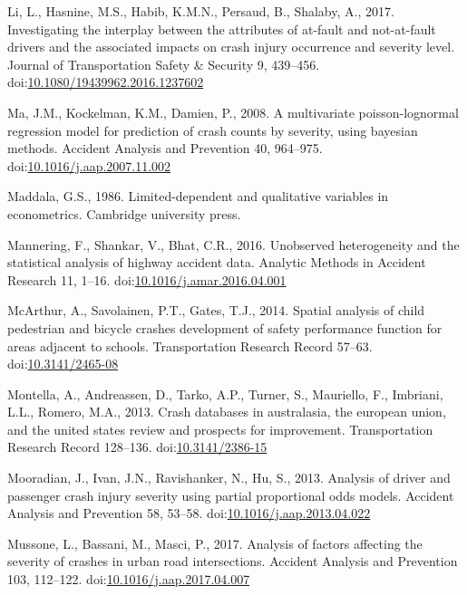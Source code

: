 \documentclass[]{elsarticle} %
\begin{document}
\leavevmode\hypertarget{ref-Li2017interplay}{}%
Li, L., Hasnine, M.S., Habib, K.M.N., Persaud, B., Shalaby, A., 2017.
Investigating the interplay between the attributes of at-fault and
not-at-fault drivers and the associated impacts on crash injury
occurrence and severity level. Journal of Transportation Safety \&
Security 9, 439--456.
doi:\href{https://doi.org/10.1080/19439962.2016.1237602}{10.1080/19439962.2016.1237602}

\leavevmode\hypertarget{ref-Ma2008multivariate}{}%
Ma, J.M., Kockelman, K.M., Damien, P., 2008. A multivariate
poisson-lognormal regression model for prediction of crash counts by
severity, using bayesian methods. Accident Analysis and Prevention 40,
964--975.
doi:\href{https://doi.org/10.1016/j.aap.2007.11.002}{10.1016/j.aap.2007.11.002}

\leavevmode\hypertarget{ref-Maddala1986limited}{}%
Maddala, G.S., 1986. Limited-dependent and qualitative variables in
econometrics. Cambridge university press.

\leavevmode\hypertarget{ref-Mannering2016unobserved}{}%
Mannering, F., Shankar, V., Bhat, C.R., 2016. Unobserved heterogeneity
and the statistical analysis of highway accident data. Analytic Methods
in Accident Research 11, 1--16.
doi:\href{https://doi.org/10.1016/j.amar.2016.04.001}{10.1016/j.amar.2016.04.001}

\leavevmode\hypertarget{ref-McArthur2014spatial}{}%
McArthur, A., Savolainen, P.T., Gates, T.J., 2014. Spatial analysis of
child pedestrian and bicycle crashes development of safety performance
function for areas adjacent to schools. Transportation Research Record
57--63. doi:\href{https://doi.org/10.3141/2465-08}{10.3141/2465-08}

\leavevmode\hypertarget{ref-Montella2013crash}{}%
Montella, A., Andreassen, D., Tarko, A.P., Turner, S., Mauriello, F.,
Imbriani, L.L., Romero, M.A., 2013. Crash databases in australasia, the
european union, and the united states review and prospects for
improvement. Transportation Research Record 128--136.
doi:\href{https://doi.org/10.3141/2386-15}{10.3141/2386-15}

\leavevmode\hypertarget{ref-Mooradian2013analysis}{}%
Mooradian, J., Ivan, J.N., Ravishanker, N., Hu, S., 2013. Analysis of
driver and passenger crash injury severity using partial proportional
odds models. Accident Analysis and Prevention 58, 53--58.
doi:\href{https://doi.org/10.1016/j.aap.2013.04.022}{10.1016/j.aap.2013.04.022}

\leavevmode\hypertarget{ref-Mussone2017analysis}{}%
Mussone, L., Bassani, M., Masci, P., 2017. Analysis of factors affecting
the severity of crashes in urban road intersections. Accident Analysis
and Prevention 103, 112--122.
doi:\href{https://doi.org/10.1016/j.aap.2017.04.007}{10.1016/j.aap.2017.04.007}
\end{document}
